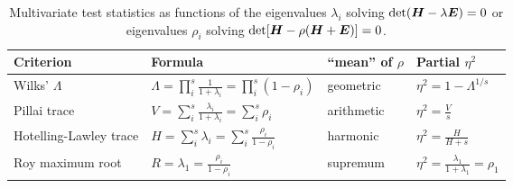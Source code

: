 %
%

\begin{table}[htb]
\renewcommand{\arraystretch}{1.6}
\caption{Multivariate test statistics as functions of the eigenvalues $\lambda_i$ solving $\mathrm{det} (\bm{H} - \lambda \bm{E})=0$
or eigenvalues $\rho_i$ solving  $\mathrm{det} [\bm{H} - \rho (\bm{H}+\bm{E})]=0$.
}\label{tab:criteria}
\begin{center}
\begin{tabular}{|l|l|l|l|}
  \hline
  Criterion & Formula & ``mean'' of $\rho$ & Partial $\eta^2$   \\
  \hline
  Wilks' $\Lambda$ & $\Lambda = \prod^s_i \frac{1}{1+\lambda_i} = \prod^s_i (1-\rho_i)$ & geometric & $\eta^2 = 1-\Lambda^{1/s}$   \\
  Pillai trace & $V = \sum^s_i \frac{\lambda_i}{1+\lambda_i} = \sum^s_i \rho_i$ & arithmetic & $\eta^2 = \frac{V}{s} $   \\
  Hotelling-Lawley trace & $H = \sum^s_i \lambda_i = \sum^s_i \frac{\rho_i}{1-\rho_i} $ & harmonic & $\eta^2 = \frac{H}{H+s}$   \\
  Roy maximum root & $R = \lambda_1 = \frac{\rho_i}{1-\rho_i}$  & supremum & $ \eta^2 = \frac{\lambda_1}{1+\lambda_1} = \rho_1$   \\
  \hline
\end{tabular}
\end{center}
\end{table}
%
